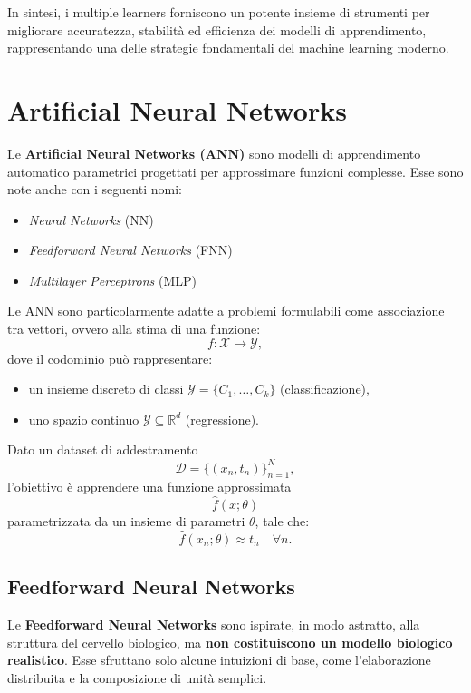 \documentclass[a4paper,12pt]{report}
\begin{document}
\begin{tcolorbox}[
    colback=green!10,
    colframe=green!50!black,
    title=\textbf{Multiple Learners -- Concetti chiave},
    fonttitle=\bfseries,
    sharp corners,
    boxrule=0.8pt,
    breakable
]
\medskip
In sintesi, i multiple learners forniscono un potente insieme di strumenti per migliorare accuratezza, stabilità ed efficienza dei modelli di apprendimento, rappresentando una delle strategie fondamentali del machine learning moderno.

\end{tcolorbox}
 
\chapter{Artificial Neural Networks}

Le \textbf{Artificial Neural Networks (ANN)} sono modelli di apprendimento automatico parametrici progettati per approssimare funzioni complesse.  
Esse sono note anche con i seguenti nomi:
\begin{itemize}
    \item \textit{Neural Networks} (NN)
    \item \textit{Feedforward Neural Networks} (FNN)
    \item \textit{Multilayer Perceptrons} (MLP)
\end{itemize}

Le ANN sono particolarmente adatte a problemi formulabili come associazione tra vettori, ovvero alla stima di una funzione:
\[
f : \mathcal{X} \rightarrow \mathcal{Y},
\]
dove il codominio può rappresentare:
\begin{itemize}
    \item un insieme discreto di classi $\mathcal{Y} = \{C_1, \dots, C_k\}$ (classificazione),
    \item uno spazio continuo $\mathcal{Y} \subseteq \mathbb{R}^d$ (regressione).
\end{itemize}

Dato un dataset di addestramento
\[
\mathcal{D} = \{(x_n, t_n)\}_{n=1}^{N},
\]
l’obiettivo è apprendere una funzione approssimata
\[
\hat{f}(x; \theta)
\]
parametrizzata da un insieme di parametri $\theta$, tale che:
\[
\hat{f}(x_n; \theta) \approx t_n \quad \forall n.
\]

\section{Feedforward Neural Networks}

Le \textbf{Feedforward Neural Networks} sono ispirate, in modo astratto, alla struttura del cervello biologico, ma \textbf{non costituiscono un modello biologico realistico}.  
Esse sfruttano solo alcune intuizioni di base, come l’elaborazione distribuita e la composizione di unità semplici.
\end{document}
